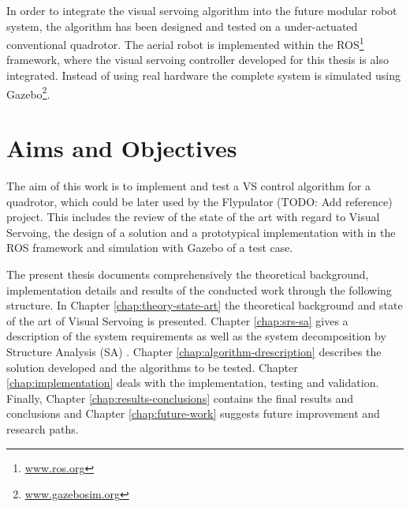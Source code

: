 
In order to integrate the visual servoing algorithm into the future modular robot system, the algorithm has been designed and tested on a under-actuated conventional quadrotor. The aerial robot is implemented within the ROS\footnote{\url{www.ros.org}} framework, where the visual servoing controller developed for this thesis is also integrated. Instead of using real hardware the complete system is simulated using Gazebo\footnote{\url{ www.gazebosim.org}}.


\section{Aims and Objectives}
\label{sec:aims-objectives}

The aim of this work is to implement and test a VS control algorithm for a quadrotor, which could be later used by the Flypulator (TODO: Add reference) project. This includes the review of the state of the art with regard to Visual Servoing, the design of a solution and a prototypical implementation with in the ROS framework and simulation with Gazebo of a test case.

The present thesis documents comprehensively the theoretical background, implementation details and results of the conducted work through the following structure. In Chapter \ref{chap:theory-state-art} the theoretical background and state of the art of Visual Servoing is presented. Chapter \ref{chap:srs-sa} gives a description of the system requirements as well as the system decomposition by Structure Analysis (SA) \cite{SA_Braune}. Chapter \ref{chap:algorithm-drescription} describes the solution developed and the algorithms to be tested. Chapter \ref{chap:implementation} deals with the implementation, testing and validation. Finally, Chapter \ref{chap:results-conclusions} contains the final results and conclusions and Chapter \ref{chap:future-work} suggests future improvement and research paths.

